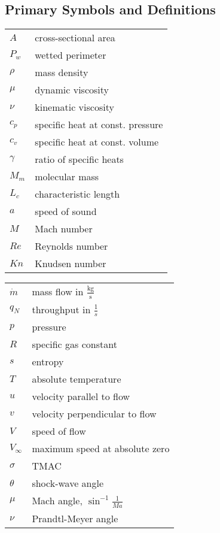 \subsection*{Primary Symbols and Definitions}

\renewcommand{\arraystretch}{1.2}
\begin{multicols}{2}
\begin{flushleft}
\begin{tabular}{ll}
$A$         & cross-sectional area \\
$P_w$       & wetted perimeter \\
$\rho$      & mass density \\
$\mu$       & dynamic viscosity \\
$\nu$       & kinematic viscosity \\
$c_p$       & specific heat at const. pressure \\
$c_v$       & specific heat at const. volume \\
$\gamma$    & ratio of specific heats \\
$M_m$       & molecular mass \\
$L_c$       & characteristic length \\
$a$         & speed of sound \\
$M$         & Mach number \\
$Re$        & Reynolds number \\ 
$Kn$        & Knudsen number \\
\end{tabular}
\end{flushleft}
\columnbreak
\begin{flushleft}
\begin{tabular}{ll}
$\dot{m}$   & mass flow in $\frac{\text{kg}}{\text{s}}$ \\
$q_N$       & throughput in $\frac{1}{s}$ \\
$p$         & pressure \\
$R$         & specific gas constant \\
$s$         & entropy\\
$T$         & absolute temperature \\
$u$         & velocity parallel to flow \\
$v$         & velocity perpendicular to flow \\
$V$         & speed of flow \\
$V_\infty$  & maximum speed at absolute zero\\
$\sigma$    & TMAC \\
$\theta$    & shock-wave angle \\
$\mu$       & Mach angle, $\sin^{-1}\frac{1}{Ma}$ \\
$\nu$       & Prandtl-Meyer angle \\
\end{tabular}
\end{flushleft}
\end{multicols}

